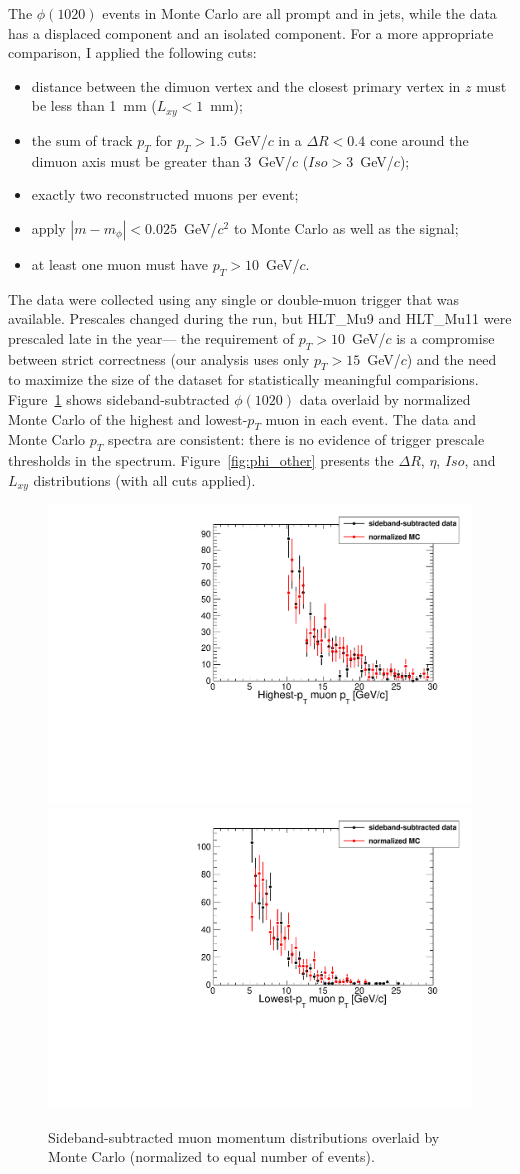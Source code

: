 \documentclass[12pt]{article}
\begin{document}
The $\phi(1020)$ events in Monte Carlo are all prompt and in jets,
while the data has a displaced component and an isolated component.
For a more appropriate comparison, I applied the following cuts:
\begin{itemize}
\item distance between the dimuon vertex and the closest primary
  vertex in $z$ must be less than 1~mm ($L_{xy} < 1$~mm);
\item the sum of track $p_T$ for $p_T > 1.5$~GeV/$c$ in a $\Delta R <
  0.4$ cone around the dimuon axis must be greater than 3~GeV/$c$
  ($Iso > 3$~GeV/$c$);
\item exactly two reconstructed muons per event;
\item apply $|m - m_\phi| < 0.025$~GeV/$c^2$ to Monte Carlo as well as
  the signal;
\item at least one muon must have $p_T > 10$~GeV/$c$.
\end{itemize}
The data were collected using any single or double-muon trigger that
was available.  Prescales changed during the run, but HLT\_Mu9 and
HLT\_Mu11 were prescaled late in the year--- the requirement of $p_T >
10$~GeV/$c$ is a compromise between strict correctness (our analysis
uses only $p_T > 15$~GeV/$c$) and the need to maximize the size of the
dataset for statistically meaningful comparisions.
Figure~\ref{fig:phi_muon12pt} shows sideband-subtracted $\phi(1020)$
data overlaid by normalized Monte Carlo of the highest and
lowest-$p_T$ muon in each event.  The data and Monte Carlo $p_T$
spectra are consistent: there is no evidence of trigger prescale
thresholds in the spectrum.  Figure~\ref{fig:phi_other} presents the
$\Delta R$, $\eta$, $Iso$, and $L_{xy}$ distributions (with all cuts
applied).

\begin{figure}
\includegraphics[width=0.5\linewidth]{phi_muon1pt.pdf}
\includegraphics[width=0.5\linewidth]{phi_muon2pt.pdf}

\caption{Sideband-subtracted muon momentum distributions overlaid by
  Monte Carlo (normalized to equal number of events). \label{fig:phi_muon12pt}}
\end{figure}
\end{document}
